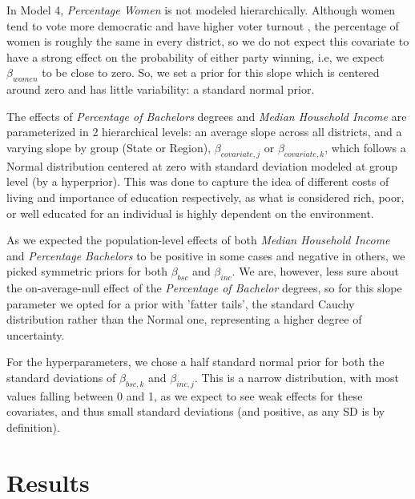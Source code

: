\documentclass[12pt]{article}
\newcommand{\red}[1]{\textcolor{red}{#1}}
\begin{document}
In Model 4, \textit{Percentage Women} is not modeled hierarchically.
Although women tend to vote more democratic and have higher voter turnout \parencite{pew2020}, the percentage of women is roughly the same in every district, so we do not expect this covariate to have a strong effect on the probability of either party winning, i.e, we expect $\beta_{women}$ to be close to zero. So, we set a prior for this slope which is centered around zero and has little variability: a standard normal prior. 



The effects of \textit{Percentage of Bachelors} degrees and \textit{Median Household Income} are parameterized in 2 hierarchical levels: an average slope across all districts, and a varying slope by group (State or Region), $\beta_{covariate,j}$ or $\beta_{covariate,k}$, which follows a Normal distribution centered at zero with standard deviation modeled at group level (by a hyperprior). This was done to capture the idea of different costs of living and importance of education respectively, as what is considered rich, poor, or well educated for an individual is highly dependent on the environment. 

 

As we expected the population-level effects of both \textit{Median Household Income} and \textit{Percentage Bachelors} to be positive in some cases and negative in others, we picked symmetric priors for both $\beta_{bsc}$ and $\beta_{inc}$. We are, however, less sure about the on-average-null effect of the \textit{Percentage of Bachelor} degrees, so for this slope parameter we opted for a prior with 'fatter tails', the standard Cauchy distribution rather than the Normal one, representing a higher degree of uncertainty.


For the hyperparameters, we chose a half standard normal prior for both the standard deviations of $\beta_{bsc,k}$ and $\beta_{inc,j}$. This is a narrow distribution, with most values falling between 0 and 1, as we expect to see weak effects for these covariates, and thus small standard deviations (and positive, as any SD is by definition).











\section{Results}
\end{document}
